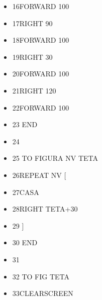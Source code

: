 \begin{minipage}{1.0\textwidth}
\begin{itemize}[itemsep=-3pt,parsep=2pt]
\item[] \hspace{0.3cm} 16\hspace{8pt}FORWARD 100 
\item[] \hspace{0.3cm} 17\hspace{8pt}RIGHT 90 
\item[] \hspace{0.3cm} 18\hspace{8pt}FORWARD 100 
\item[] \hspace{0.3cm} 19\hspace{8pt}RIGHT 30 
\item[] \hspace{0.3cm} 20\hspace{8pt}FORWARD 100 
\item[] \hspace{0.3cm} 21\hspace{8pt}RIGHT 120 
\item[] \hspace{0.3cm} 22\hspace{8pt}FORWARD 100 
\item[] \hspace{0.3cm} 23 END
\item[] \hspace{0.3cm} 24
\item[] \hspace{0.3cm} 25 TO FIGURA NV TETA
\item[] \hspace{0.3cm} 26\hspace{8pt}REPEAT NV [ 
\item[] \hspace{0.3cm} 27\hspace{8pt}CASA
\item[] \hspace{0.3cm} 28\hspace{8pt}RIGHT TETA+30
\item[] \hspace{0.3cm} 29    ]
\item[] \hspace{0.3cm} 30 END
\item[] \hspace{0.3cm} 31
\item[] \hspace{0.3cm} 32 TO FIG TETA
\item[] \hspace{0.3cm} 33\hspace{8pt}CLEARSCREEN

\end{itemize}
\end{minipage}
